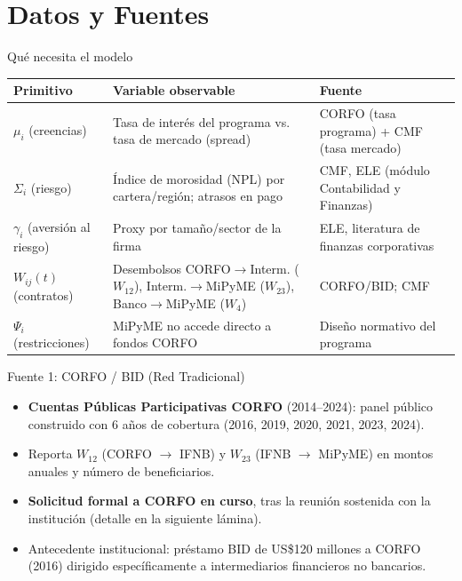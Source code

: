 \documentclass[aspectratio=169]{beamer}
\begin{document}
\section{Datos y Fuentes}

\begin{frame}{Qué necesita el modelo}
\begin{table}
\centering
\small
\begin{tabular}{@{}p{2.6cm}p{4.6cm}p{4.4cm}@{}}
\toprule
\textbf{Primitivo} & \textbf{Variable observable} & \textbf{Fuente} \\
\midrule
$\mu_i$ (creencias) & Tasa de interés del programa vs. tasa de mercado (spread) & CORFO (tasa programa) + CMF (tasa mercado) \\
$\Sigma_i$ (riesgo) & Índice de morosidad (NPL) por cartera/región; atrasos en pago & CMF, ELE (módulo Contabilidad y Finanzas) \\
$\gamma_i$ (aversión al riesgo) & Proxy por tamaño/sector de la firma & ELE, literatura de finanzas corporativas \\
$W_{ij}(t)$ (contratos) & Desembolsos CORFO$\to$Interm. ($W_{12}$), Interm.$\to$MiPyME ($W_{23}$), Banco$\to$MiPyME ($W_{4}$) & CORFO/BID; CMF \\
$\Psi_i$ (restricciones) & MiPyME no accede directo a fondos CORFO & Diseño normativo del programa \\
\bottomrule
\end{tabular}
\end{table}
\end{frame}

\begin{frame}{Fuente 1: CORFO / BID (Red Tradicional)}
\begin{itemize}
    \item \textbf{Cuentas Públicas Participativas CORFO} (2014--2024): panel público construido con 6 años de cobertura (2016, 2019, 2020, 2021, 2023, 2024).
    \item Reporta $W_{12}$ (CORFO $\to$ IFNB) y $W_{23}$ (IFNB $\to$ MiPyME) en montos anuales y número de beneficiarios.
    \item \textbf{Solicitud formal a CORFO en curso}, tras la reunión sostenida con la institución (detalle en la siguiente lámina).
    \item Antecedente institucional: préstamo BID de US\$120 millones a CORFO (2016) dirigido específicamente a intermediarios financieros no bancarios.
\end{itemize}
\end{frame}
\end{document}
